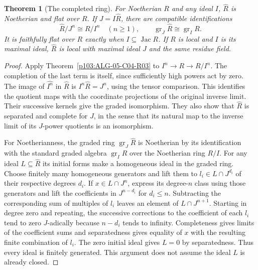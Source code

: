 \documentclass[11pt,oneside,openany]{book}
\newtheorem{theorem}{Theorem}[chapter]
\theoremstyle{definition}
\theoremstyle{remark}
\begin{document}
\begin{theorem}[The completed ring]\label{p103:ALG-05-C04-S01}
For Noetherian \(R\) and any ideal \(I\), \(\widehat R\) is Noetherian and flat over \(R\). If \(J=I\widehat R\), there are compatible identifications
\[
 \widehat R/J^n\cong R/I^n\quad(n\ge1),\qquad
 \operatorname{gr}_{J}\widehat R\cong\operatorname{gr}_I R.
\]
It is faithfully flat over \(R\) exactly when \(I\subseteq\operatorname{Jac}R\). If \(R\) is local and \(I\) is its maximal ideal, \(\widehat R\) is local with maximal ideal \(J\) and the same residue field.
\end{theorem}
\begin{proof}
Apply Theorem~\ref{p103:ALG-05-C04-R03} to \(I^n\to R\to R/I^n\). The completion of the last term is itself, since sufficiently high powers act by zero. The image of \(\widehat{I^n}\) in \(\widehat R\) is \(I^n\widehat R=J^n\), using the tensor comparison. This identifies the quotient maps with the coordinate projections of the original inverse limit. Their successive kernels give the graded isomorphism. They also show that \(\widehat R\) is separated and complete for \(J\), in the sense that its natural map to the inverse limit of its \(J\)-power quotients is an isomorphism.

For Noetherianness, the graded ring \(\operatorname{gr}_{J}\widehat R\) is Noetherian by its identification with the standard graded algebra \(\operatorname{gr}_I R\) over the Noetherian ring \(R/I\). For any ideal \(L\subseteq\widehat R\) its initial forms make a homogeneous ideal in the graded ring. Choose finitely many homogeneous generators and lift them to \(l_i\in L\cap J^{d_i}\) of their respective degrees \(d_i\). If \(x\in L\cap J^n\), express its degree-\(n\) class using those generators and lift the coefficients in \(J^{n-d_i}\) for \(d_i\le n\). Subtracting the corresponding sum of multiples of \(l_i\) leaves an element of \(L\cap J^{n+1}\). Starting in degree zero and repeating, the successive corrections to the coefficient of each \(l_i\) tend to zero \(J\)-adically because \(n-d_i\) tends to infinity. Completeness gives limits of the coefficient sums and separatedness gives equality of \(x\) with the resulting finite combination of \(l_i\). The zero initial ideal gives \(L=0\) by separatedness. Thus every ideal is finitely generated. This argument does not assume the ideal \(L\) is already closed.


\end{proof}
\end{document}
